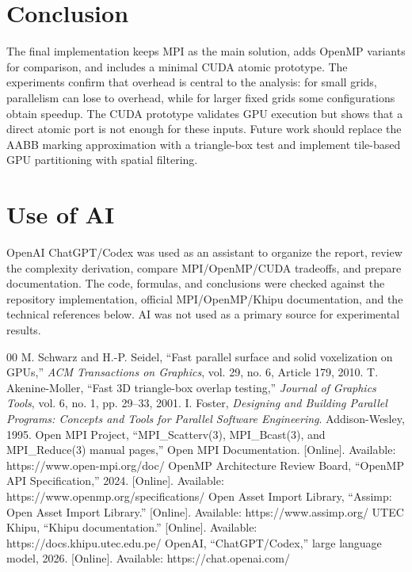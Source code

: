 \documentclass[conference]{IEEEtran}
\begin{document}
\section{Conclusion}

The final implementation keeps MPI as the main solution, adds OpenMP variants
for comparison, and includes a minimal CUDA atomic prototype. The experiments
confirm that overhead is central to the analysis: for small grids, parallelism
can lose to overhead, while for larger fixed grids some configurations obtain
speedup. The CUDA prototype validates GPU execution but shows that a direct
atomic port is not enough for these inputs. Future work should replace the AABB
marking approximation with a triangle-box test and implement tile-based GPU
partitioning with spatial filtering.

\section*{Use of AI}

OpenAI ChatGPT/Codex was used as an assistant to organize the report, review
the complexity derivation, compare MPI/OpenMP/CUDA tradeoffs, and prepare
documentation. The code, formulas, and conclusions were checked against the
repository implementation, official MPI/OpenMP/Khipu documentation, and the
technical references below. AI was not used as a primary source for
experimental results.

\begin{thebibliography}{00}
   M. Schwarz and H.-P. Seidel, ``Fast parallel surface and solid voxelization on GPUs,'' \textit{ACM Transactions on Graphics}, vol. 29, no. 6, Article 179, 2010.
   T. Akenine-Moller, ``Fast 3D triangle-box overlap testing,'' \textit{Journal of Graphics Tools}, vol. 6, no. 1, pp. 29--33, 2001.
   I. Foster, \textit{Designing and Building Parallel Programs: Concepts and Tools for Parallel Software Engineering}. Addison-Wesley, 1995.
   Open MPI Project, ``MPI\_Scatterv(3), MPI\_Bcast(3), and MPI\_Reduce(3) manual pages,'' Open MPI Documentation. [Online]. Available: https://www.open-mpi.org/doc/
   OpenMP Architecture Review Board, ``OpenMP API Specification,'' 2024. [Online]. Available: https://www.openmp.org/specifications/
   Open Asset Import Library, ``Assimp: Open Asset Import Library.'' [Online]. Available: https://www.assimp.org/
   UTEC Khipu, ``Khipu documentation.'' [Online]. Available: https://docs.khipu.utec.edu.pe/
   OpenAI, ``ChatGPT/Codex,'' large language model, 2026. [Online]. Available: https://chat.openai.com/
\end{thebibliography}
\end{document}
